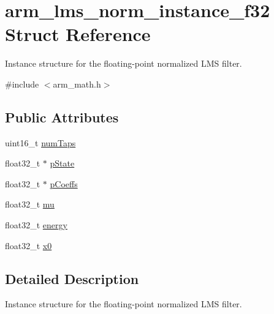 \hypertarget{structarm__lms__norm__instance__f32}{\section{arm\-\_\-lms\-\_\-norm\-\_\-instance\-\_\-f32 Struct Reference}
\label{structarm__lms__norm__instance__f32}
}


Instance structure for the floating-\/point normalized L\-M\-S filter.  




{\ttfamily \#include $<$arm\-\_\-math.\-h$>$}

\subsection*{Public Attributes}
\begin{DoxyCompactItemize}
\item 
uint16\-\_\-t \hyperlink{structarm__lms__norm__instance__f32_ac95f8ca3d816524c2070643852fac5e8}{num\-Taps}
\item 
float32\-\_\-t $\ast$ \hyperlink{structarm__lms__norm__instance__f32_a0bc03338687002ed5f2e4a363eb095ec}{p\-State}
\item 
float32\-\_\-t $\ast$ \hyperlink{structarm__lms__norm__instance__f32_a1ba688d90aba7de003ed4ad8e2e7ddda}{p\-Coeffs}
\item 
float32\-\_\-t \hyperlink{structarm__lms__norm__instance__f32_a84401d3cfc6c40f69c08223cf341b886}{mu}
\item 
float32\-\_\-t \hyperlink{structarm__lms__norm__instance__f32_a6a4119e4f39447bbee31b066deafa16f}{energy}
\item 
float32\-\_\-t \hyperlink{structarm__lms__norm__instance__f32_aec958fe89b164a30f38bcca9f5d96218}{x0}
\end{DoxyCompactItemize}


\subsection{Detailed Description}
Instance structure for the floating-\/point normalized L\-M\-S filter. 

